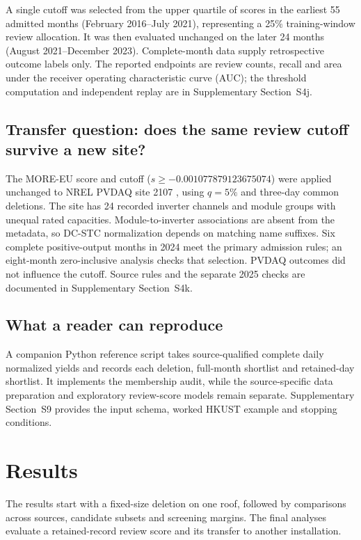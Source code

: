 \documentclass[preprint,12pt]{elsarticle}
\begin{document}
A single cutoff was selected from the upper quartile of scores in the earliest 55 admitted months (February 2016--July 2021), representing a 25\% training-window review allocation. It was then evaluated unchanged on the later 24 months (August 2021--December 2023). Complete-month data supply retrospective outcome labels only. The reported endpoints are review counts, recall and area under the receiver operating characteristic curve (AUC); the threshold computation and independent replay are in Supplementary Section~S4j.

\subsection{Transfer question: does the same review cutoff survive a new site?}
The MORE-EU score and cutoff ($s\geq-0.001077879123675074$) were applied unchanged to NREL PVDAQ site 2107 \cite{deline2021}, using $q=5\%$ and three-day common deletions. The site has 24 recorded inverter channels and module groups with unequal rated capacities. Module-to-inverter associations are absent from the metadata, so DC-STC normalization depends on matching name suffixes. Six complete positive-output months in 2024 meet the primary admission rules; an eight-month zero-inclusive analysis checks that selection. PVDAQ outcomes did not influence the cutoff. Source rules and the separate 2025 checks are documented in Supplementary Section~S4k.

\subsection{What a reader can reproduce}
A companion Python reference script takes source-qualified complete daily normalized yields and records each deletion, full-month shortlist and retained-day shortlist. It implements the membership audit, while the source-specific data preparation and exploratory review-score models remain separate. Supplementary Section~S9 provides the input schema, worked HKUST example and stopping conditions.

\section{Results}
The results start with a fixed-size deletion on one roof, followed by comparisons across sources, candidate subsets and screening margins. The final analyses evaluate a retained-record review score and its transfer to another installation.
\end{document}
